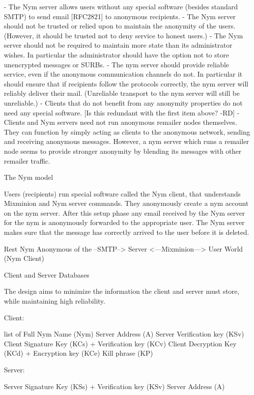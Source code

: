 - The Nym server allows users without any special software (besides
  standard SMTP) to send email [RFC2821] to anonymous recipients.
- The Nym server should not be trusted or relied upon to maintain the
  anonymity of the users. (However, it should be trusted not to deny
  service to honest users.)
- The Nym server should not be required to maintain more state than
  its administrator wishes. In particular the administrator should
  have the option not to store unencrypted messages or SURBs.
- The nym server should provide reliable service, even if the
  anonymous communication channels do not. In particular it should
  ensure that if recipients follow the protocols correctly, the nym
  server will reliably deliver their mail. (Unreliable transport to
  the nym server will still be unreliable.)
- Clients that do not benefit from any anonymity properties do not
  need any special software.
[Is this redundant with the first item above? -RD]
- Clients and Nym servers need not run anonymous remailer nodes
  themselves. They can function by simply acting as clients to the
  anonymous network, sending and receiving anonymous messages. However,
  a nym server which runs a remailer node seems to provide stronger
  anonymity by blending its messages with other remailer traffic.


The Nym model

Users (recipients) run special software called the Nym client, that
understands Mixminion and Nym server commands. They anonymously create
a nym account on the nym server. After this setup phase any email
received by the Nym server for the nym is anonymously forwarded to
the appropriate user. The Nym server makes sure that the message has
correctly arrived to the user before it is deleted.

   Rest           Nym                      Anonymous
 of the --SMTP--> Server <---Mixminion---> User
  World                                    (Nym Client)

Client and Server Databases

The design aims to minimize the information the client and server must
store, while maintaining high reliability.

Client:

list of {
  Full Nym Name (Nym)
  Server Address (A)
  Server Verification key (KSv)
  Client Signature Key (KCs) + Verification key (KCv)
  Client Decryption Key (KCd) + Encryption key (KCe)
  Kill phrase (KP)
}

Server:

Server Signature Key (KSs) + Verification key (KSv)
Server Address (A)

